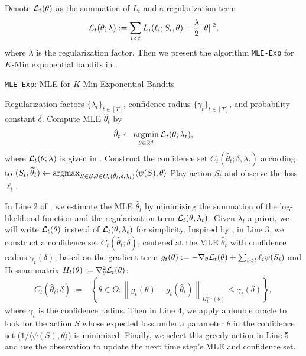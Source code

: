 Denote ${\mathcal{L}}_t(\theta)$ as the summation of $L_t$ and a regularization term
\begin{align}\label{eq:loglikelihood-def}
    {\mathcal{L}}_t(\theta; \lambda) := \sum_{i < t} L_i(\ell_i; S_i, \theta) + \frac{\lambda}{2}\|\theta\|^2,
\end{align}
where $\lambda$ is the regularization factor. Then we present the algorithm \texttt{MLE-Exp} for $K$-Min exponential bandits in .

\begin{algorithm}
\caption{\texttt{MLE-Exp}: MLE for $K$-Min Exponential Bandits}
\label{alg:k-min}
\begin{algorithmic}[1]
\REQUIRE Regularization factors $\{\lambda_t\}_{t\in [T]}$, confidence radius $\{\gamma_t\}_{t\in [T]}$, and probability constant $\delta$.
    \STATE Compute MLE $\hat\theta_t$ by
    $$\hat{\theta}_t \leftarrow \operatorname*{argmin}_{\theta \in \mathbb{R}^d} \mathcal{L}_t(\theta; \lambda_t),$$
    where ${\mathcal{L}}_t(\theta;\lambda)$ is given in . 
    \STATE Construct the confidence set $C_t(\hat\theta_t; \delta, \lambda_t)$ according to 
    \STATE $(S_t, \widetilde{\theta}_t) \leftarrow \operatorname*{argmax}_{S \in {\mathcal{S}}, \theta \in C_t(\hat{\theta}_t; \delta, \lambda_t)} \langle \psi(S), \theta \rangle$ 
    \STATE Play action $S_t$ and observe the loss $\ell_t$. 
\ENDFOR
\end{algorithmic}
\end{algorithm}

In Line 2 of , we estimate the MLE $\hat\theta_t$ by minimizing the summation of the log-likelihood function and the regularization term ${\mathcal{L}}_t(\theta, \lambda_t)$. 
%
Given $\lambda_t$ a priori, we will write ${\mathcal{L}}_t(\theta)$ instead of ${\mathcal{L}}_t(\theta, \lambda_t)$ for simplicity. 
%
Inspired by \citet{liu2024almost, lee2024unified, liu2024combinatorial}, in Line 3, we construct a confidence set $C_t(\hat\theta_t;\delta)$, centered at the MLE $\hat\theta_t$ with confidence radius $\gamma_t(\delta)$, based on the gradient term $g_t(\theta) := -\nabla_\theta {\mathcal{L}}_t(\theta) + \sum_{i < t} \ell_i \psi(S_i)$ and Hessian matrix $H_t(\theta) := \nabla^2_\theta {\mathcal{L}}_t(\theta)$:
\begin{align}\label{eq:}
    C_t(\hat\theta_t; \delta) :=  
    &\left\{ \theta \in \Theta : \left\|g_t(\theta) - g_t(\hat\theta_t)\right\|_{H_t^{-1}(\theta)} \le \gamma_t(\delta)\right\},
\end{align}
where $\gamma_t$ is the confidence radius. 
Then in Line 4, we apply a double oracle to look for the action $S$ whose expected loss under a parameter $\theta$ in the confidence set ($1/\langle \psi(S), \theta \rangle$) is minimized.
%
Finally, we select this greedy action in Line 5 and use the observation to update the next time step's MLE and confidence set. 





